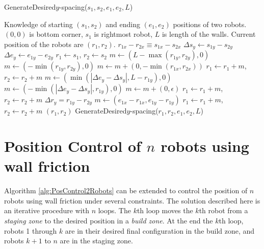 \begin{algorithm}
\caption{GenerateDesired$y$-spacing($s_1,s_2,e_1,e_2,L$)}\label{alg:YControl}
\begin{algorithmic}[1]
\Require Knowledge of starting $(s_1,s_2)$ and ending $(e_1,e_2)$ positions of  two robots. 
$(0,0)$ is bottom corner, $s_1$ is rightmost robot, 
 $L$ is length of the walls. Current position of the robots are $(r_1,r_2)$.
\Ensure   $ r_{1x} - r_{2x}  \equiv s_{1x} - s_{2x} $   %
\State $ \Delta s_y  \gets s_{1y} - s_{2y} $
\State $ \Delta e_y \gets e_{1y} - e_{2y} $
\State $ r_1 \gets s_1$, $ r_2 \gets s_2$
\State $ m \gets ( L-\max( r_{1y},r_{2y}) ,0)   $ 
\Else 
\State  $ m \gets ( -\min( r_{1y},r_{2y}),0 )    $ 
\EndIf
\State $m  \gets  m + (0, -\min( r_{1x},r_{2x} ))$ 
\State $ r_1 \gets r_1+m$, $ r_2 \gets r_2+m$ 
\State $ m \gets (\min(|\Delta e_y - \Delta s_y |, L- r_{1y}), 0)$  
\Else
\State $ m \gets (-\min(|\Delta e_y - \Delta s_y |, r_{1y}), 0)$
\EndIf 
\State $m  \gets  m + (0, \epsilon)$ 
\State $ r_1 \gets r_1+m$, $ r_2 \gets r_2+m$ 
\State $\Delta r_y = r_{1y} - r_{2y}$
\State   $ m \gets (e_{1x}-r_{1x}, e_{1y}-r_{1y})$
\State $ r_1 \gets r_1+m$, $ r_2 \gets r_2+m$ 
\State  \Return $(r_1,r_2)$
\Else   
\State \Return GenerateDesired$y$-spacing($r_1,r_2,e_1,e_2,L$)
\EndIf
\end{algorithmic}
\end{algorithm}






\section{Position Control of $n$ robots using wall friction}\label{sec:PostionControlnRobots}
Algorithm \ref{alg:PosControl2Robots}  can be extended to control the position of $n$ robots using wall friction under several constraints. The solution described here is an iterative procedure with $n$ loops. The $k$th loop moves the $k$th robot from a \emph{staging zone} to the desired position in a \emph{build zone}. At the end the $k$th loop, robots 1 through $k$ are in their desired final configuration in the build zone, and robots $k+1$ to $n$ are in the staging zone.



